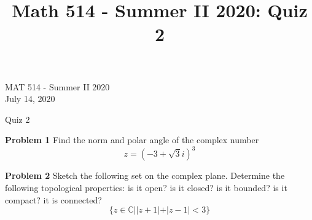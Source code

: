 \documentclass[12pt,oneside]{exam}
\title{Math 514 - Summer II 2020: Quiz 2}
\newenvironment{exercise}[1]{\vspace{.1in}\noindent\textbf{Problem #1 \hspace{.05em}}}{}
\begin{document}
\begin{flushright}
\sc MAT 514 - Summer II 2020\\
July 14, 2020
\end{flushright}
\bigskip
 
\begin{center}
\textsf{Quiz 2} 
\end{center}


\begin{exercise}{1}
Find the norm and polar angle of the complex number
\begin{equation*}
z=(-3 + \sqrt{3}i)^3
\end{equation*}
\end{exercise}

\vfill
\begin{exercise}{2}
Sketch the following set on the complex plane. Determine the following topological properties: is it open? is it closed? is it bounded? is it compact? it is connected?
\begin{equation*}
\{z \in \mathbb{C} | |z+1|+|z-1| < 3\}
\end{equation*}
\end{exercise}
\vfill
\end{document}
